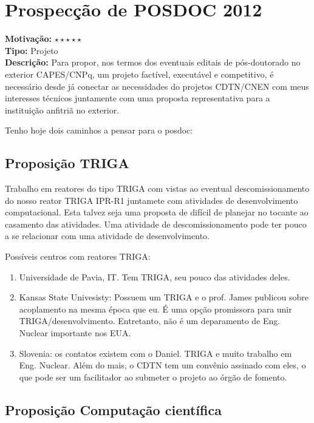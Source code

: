 \chapter{Prospecção de POSDOC 2012}
\label{posdoc}

\textbf{Motivação:} $\star\star\star\star\star$\\

\textbf{Tipo:} Projeto\\

\textbf{Descrição:} Para propor, nos termos dos eventuais editais de pós-doutorado no exterior CAPES/CNPq, um projeto factível, executável e competitivo, é necessário 
desde já conectar as necessidades do projetos CDTN/CNEN com meus interesses técnicos juntamente com uma proposta representativa para a instituição anfitriã 
no exterior.

Tenho hoje dois caminhos a pensar para o posdoc:

\section{Proposição TRIGA}
 Trabalho em reatores do tipo TRIGA com vistas ao eventual descomissionamento do nosso reator TRIGA IPR-R1 juntamete com atividades de desenvolvimento computacional. Esta talvez seja uma proposta de difícil de planejar no tocante 
 ao casamento das atividades. Uma atividade de descomissionamento pode ter pouco 
 a se relacionar com uma atividade de desenvolvimento.
 
 Possíveis centros com reatores TRIGA:
 \begin{enumerate}
 	\item Universidade de Pavia, IT. Tem TRIGA, seu pouco das atividades deles.
 	\item Kansas State Univesisty: Possuem um TRIGA e o prof. James publicou sobre acoplamento na mesma época que eu. É uma opção promissora para unir TRIGA/desenvolvimento. Entretanto, não é um deparamento de Eng. Nuclear importante nos EUA.
 	\item Slovenia: os contatos existem com o Daniel. TRIGA e muito trabalho em Eng. Nuclear. Além do mais, o CDTN tem um convênio assinado com eles, o que pode 
 	ser um facilitador ao submeter o projeto ao órgão de fomento.
 \end{enumerate}

\section{Proposição Computação científica}

